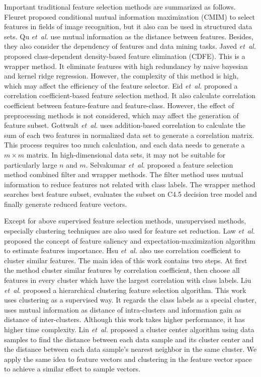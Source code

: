 \documentclass{ieeeaccess}
\theoremstyle{definition}
\begin{document}
Important traditional feature selection methods are summarized as follows. 
Fleuret \cite{Fleuret2004} proposed conditional mutual information maximization (CMIM) to select features in fields of image recognition, but it also can be used in structured data sets. 
Qu \emph{et~al.} \cite{Qu2005} use mutual information as the distance between features. Besides, they also consider the dependency of features and data mining tasks. 
Javed \emph{et~al.} \cite{Javed2012} proposed class-dependent density-based feature elimination (CDFE). This is a wrapper method. It eliminate features with high redundancy by naive bayesian and kernel ridge regression. However, the complexity of this method is high, which may affect the efficiency of the feature selector.
Eid \emph{et~al.} \cite{Eid2013} proposed a correlation coefficient-based feature selection method. It also calculate correlation coefficient between feature-feature and feature-class. However, the effect of preprocessing methods is not considered, which may affect the generation of feature subset. 
Gottwalt \emph{et~al.} \cite{CorrCorr2019} uses addition-based correlation to calculate the sum of each two features in normalized data set to generate a correlation matrix. This process requires too much calculation, and each data needs to generate a $m \times m$ matrix. In high-dimensional data sets, it may not be suitable for particularly large $n$ and $m$.
Selvakumar \emph{et~al.} \cite{Selvakumar2019} proposed a feature selection method combined filter and wrapper methods. The filter method uses mutual information to reduce features not related with class labels. The wrapper method searches best feature subset, evaluates the subset on C4.5 decision tree model and finally generate reduced feature vectors. 

Except for above supervised feature selection methods, unsupervised methods, especially clustering techniques are also used for feature set reduction.
Law \emph{et~al.} \cite{Law2004} proposed the concept of feature saliency and expectation-maximization algorithm to estimate features importance. 
Hsu \emph{et~al.} \cite{Hsu2010} also use correlation coefficient to cluster similar features. The main idea of this work contains two steps. At first the method cluster similar features by correlation coefficient, then choose all features in every cluster which have the largest correlation with class labels. 
Liu \emph{et~al.} \cite{Liu2011} proposed a hierarchical clustering feature selection algorithm. This work uses clustering as a supervised way. It regards the class labels as a special cluster, uses mutual information as distance of intra-clusters and information gain as distance of inter-clusters. Although this work takes higher performance, it has higher time complexity. 
Lin \emph{et~al.} \cite {CANN2015} proposed a cluster center algorithm using data samples to find the distance between each data sample and its cluster center and the distance between each data sample's nearest neighbor in the same cluster. We apply the same idea to feature vectors and clustering in the feature vector space to achieve a similar effect to sample vectors.
\end{document}
